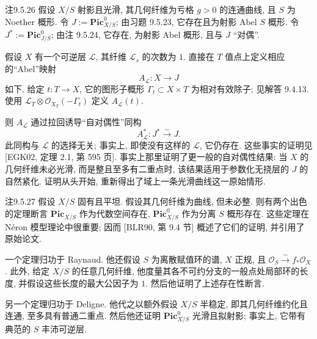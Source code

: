 \begin{origstatement}{注}{9.5.26}\label{ch09s05:rem9.5.26}
假设 $X/S$ 射影且光滑, 其几何纤维为亏格 $g>0$ 的连通曲线, 且 $S$ 为 Noether 概形. 令 $J:=\mathbf{Pic}^0_{X/S}$; 由习题 9.5.23, 它存在且为射影 Abel $S$ 概形. 令 $J^*:=\mathbf{Pic}^0_{J/S}$; 由注 9.5.24, 它存在, 为射影 Abel 概形, 且与 $J$ “对偶”.

假设 $X$ 有一个可逆层 $\mathcal L$, 其纤维 $\mathcal L_s$ 的次数为 $1$. 直接在 $T$ 值点上定义相应的“Abel”映射
\[
 A_{\mathcal L}:X\longrightarrow J
\]
如下. 给定 $t:T\to X$, 它的图形子概形 $\Gamma_t\subset X\times T$ 为相对有效除子; 见解答 9.4.13. 使用 $\mathcal L_T\otimes\mathcal O_{X_T}(-\Gamma_t)$ 定义 $A_{\mathcal L}(t)$.

则 $A_{\mathcal L}$ 通过拉回诱导“自对偶性”同构
\[
 A_{\mathcal L}^*:J^*\xrightarrow{\sim}J.
\]
此同构与 $\mathcal L$ 的选择无关; 事实上, 即使没有这样的 $\mathcal L$, 它仍存在. 这些事实的证明见 [EGK02, 定理 2.1, 第 595 页]. 事实上那里证明了更一般的自对偶性结果: 当 $X$ 的几何纤维未必光滑, 而是整且至多有二重点时, 该结果适用于参数化无挠层的 $J$ 的自然紧化. 证明从头开始, 重新得出了域上一条光滑曲线这一原始情形.
\end{origstatement}

\begin{origstatement}{注}{9.5.27}\label{ch09s05:rem9.5.27}
假设 $X/S$ 固有且平坦. 假设其几何纤维为曲线, 但未必整. 则有两个出色的定理断言 $\mathbf{Pic}_{X/S}$ 作为代数空间存在, $\mathbf{Pic}^0_{X/S}$ 作为分离 $S$ 概形存在. 这些定理在 N\'eron 模型理论中很重要; 因而 [BLR90, 第 9.4 节] 概述了它们的证明, 并引用了原始论文.

一个定理归功于 Raynaud. 他还假设 $S$ 为离散赋值环的谱, $X$ 正规, 且 $\mathcal O_S\xrightarrow{\sim}f_*\mathcal O_X$. 此外, 给定 $X/S$ 的任意几何纤维, 他度量其各不可约分支的一般点处局部环的长度, 并假设这些长度的最大公因子为 $1$. 然后他证明了上述存在性断言.

另一个定理归功于 Deligne. 他代之以额外假设 $X/S$ 半稳定, 即其几何纤维约化且连通, 至多具有普通二重点. 然后他还证明 $\mathbf{Pic}^0_{X/S}$ 光滑且拟射影; 事实上, 它带有典范的 $S$ 丰沛可逆层.
\end{origstatement}

